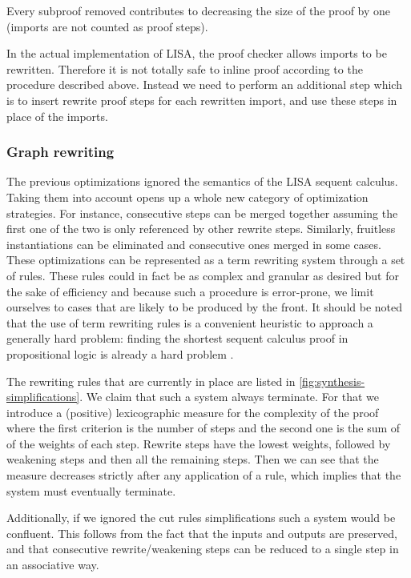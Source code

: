 Every subproof removed contributes to decreasing the size of the proof by one (imports are not counted as proof steps).

In the actual implementation of LISA, the proof checker allows imports to be rewritten. Therefore it is not totally safe to inline proof according to the procedure described above. Instead we need to perform an additional step which is to insert rewrite proof steps for each rewritten import, and use these steps in place of the imports.

\subsubsection{Graph rewriting}

The previous optimizations ignored the semantics of the LISA sequent calculus. Taking them into account opens up a whole new category of optimization strategies.
For instance, consecutive  steps can be merged together assuming the first one of the two is only referenced by other rewrite steps. Similarly, fruitless instantiations can be eliminated and consecutive ones merged in some cases. These optimizations can be represented as a term rewriting system through a set of rules. These rules could in fact be as complex and granular as desired but for the sake of efficiency and because such a procedure is error-prone, we limit ourselves to cases that are likely to be produced by the front. It should be noted that the use of term rewriting rules is a convenient heuristic to approach a generally hard problem: finding the shortest sequent calculus proof in propositional logic is already a hard problem \cite{Krajicek1994}.

The rewriting rules that are currently in place are listed in \autoref{fig:synthesis-simplifications}. We claim that such a system always terminate. For that we introduce a (positive) lexicographic measure for the complexity of the proof where the first criterion is the number of steps and the second one is the sum of of the weights of each step. Rewrite steps have the lowest weights, followed by weakening steps and then all the remaining steps. Then we can see that the measure decreases strictly after any application of a rule, which implies that the system must eventually terminate.

Additionally, if we ignored the cut rules simplifications such a system would be confluent. This follows from the fact that the inputs and outputs are preserved, and that consecutive rewrite/weakening steps can be reduced to a single step in an associative way.

